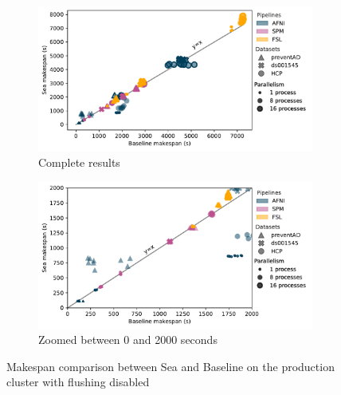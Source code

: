 \documentclass[fleqn,10pt]{wlscirep}
\begin{document}
\begin{figure}

\begin{subfigure}{0.5\textwidth}
    \centering
    \captionsetup{width=.85\linewidth}
    \includegraphics[width=\columnwidth]{figures/beluga_withoutflush_nozoom.pdf}%
    \caption{Complete results}\label{fig:seaneuro:belugafull}
\end{subfigure}
\begin{subfigure}{0.5\textwidth}
    \centering
    \captionsetup{width=.85\linewidth}
    \includegraphics[width=\linewidth]{figures/beluga_withoutflush_zoom.pdf}
    \caption{Zoomed between 0 and 2000 seconds}\label{fig:seaneuro:belugazoom}
\end{subfigure}
\caption{Makespan comparison between Sea and Baseline on the production cluster with flushing disabled}
\label{fig:seaneuro:beluga-noflush}
\end{figure}
\end{document}
